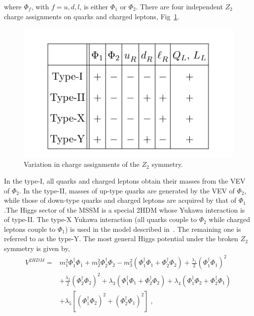 \newline
where $\Phi_f$, with $f=u,d,l$,  is either   $\Phi_1$ or $\Phi_2$. There are four independent $Z_2$ charge assignments on quarks and charged leptons, Fig~\ref{2hdm}.
\begin{figure}
\centering
\includegraphics[scale= 0.8]{../Cap1/2hdm}
\caption{Variation in charge assignments of the $Z_2$ symmetry.}
\label{2hdm}
\end{figure}
 In the type-I, all quarks and charged leptons obtain their masses from the VEV of $\Phi_2$.  
In the type-II, masses of up-type quarks are generated by the VEV of  $\Phi_2$, while those of down-type quarks and charged leptons are acquired by that of  $\Phi_1$.The Higgs sector of the MSSM is a special 2HDM whose Yukawa interaction is of type-II. The type-X Yukawa interaction (all quarks couple to  $\Phi_2$ while charged leptons couple to  $\Phi_1$) is used in the model described in~\cite{PhysRevD.80.015017}. The remaining one is referred to as the type-Y.
The most general Higgs potential under the  broken $Z_2$ symmetry is given by,
\newline
\begin{equation}
\begin{split}
V^{2HDM}=& m_1^2 \Phi_1^{\dag}\Phi_1 +m_2^2 \Phi_2^{\dag}\Phi_2 -m_3^2(\Phi_1^{\dag}\Phi_1 +  \Phi_2^{\dag}\Phi_2) +\frac{\lambda_1}{2}(\Phi_1^{\dag}\Phi_1)^2  \\
&+\frac{\lambda_2}{2}(\Phi_2^{\dag}\Phi_2)^2  +\lambda_3 (\Phi_1^{\dag}\Phi_1 +  \Phi_2^{\dag}\Phi_2) +\lambda_4 (\Phi_1^{\dag}\Phi_2 +  \Phi_2^{\dag}\Phi_1)  \\
&+\lambda_5 [(\Phi_1^{\dag}\Phi_2)^2 + (\Phi_2^{\dag}\Phi_1)^2] \; , \end{split} \end{equation}
